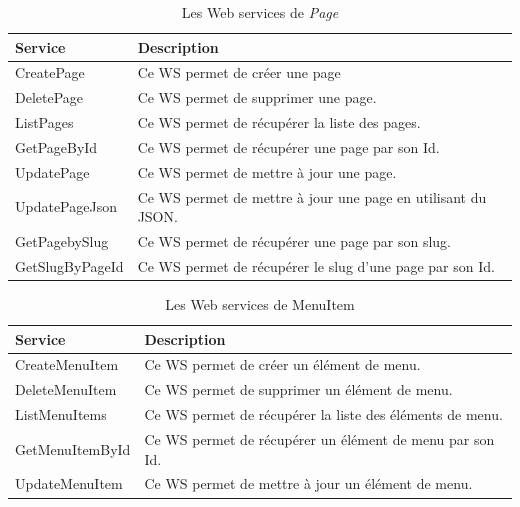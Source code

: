 \begin{table}[H]
    \centering
    \begin{tabular}{|m{5cm}|m{10cm}|}
        \hline
        \textbf{Service} & \textbf{Description}                                         \\
        \hline
        CreatePage       & Ce WS permet de créer une page                               \\
        \hline
        DeletePage       & Ce WS permet de supprimer une page.                          \\
        \hline
        ListPages        & Ce WS permet de récupérer la liste des pages.                \\
        \hline
        GetPageById      & Ce WS permet de récupérer une page par son Id.               \\
        \hline
        UpdatePage       & Ce WS permet de mettre à jour une page.                      \\
        \hline
        UpdatePageJson   & Ce WS permet de mettre à jour une page en utilisant du JSON. \\
        \hline
        GetPagebySlug    & Ce WS permet de récupérer une page par son slug.             \\
        \hline
        GetSlugByPageId  & Ce WS permet de récupérer le slug d'une page par son Id.     \\
        \hline
    \end{tabular}
    \caption{Les Web services de \textit{Page}}
    \label{tab:my_label}
\end{table}





\begin{table}[H]
    \centering
    \begin{tabular}{|m{5cm}|m{10cm}|}
        \hline
        \textbf{Service} & \textbf{Description}                                     \\
        \hline
        CreateMenuItem   & Ce WS permet de créer un élément de menu.                \\
        \hline
        DeleteMenuItem   & Ce WS permet de supprimer un élément de menu.            \\
        \hline
        ListMenuItems    & Ce WS permet de récupérer la liste des éléments de menu. \\
        \hline
        GetMenuItemById  & Ce WS permet de récupérer un élément de menu par son Id. \\
        \hline
        UpdateMenuItem   & Ce WS permet de mettre à jour un élément de menu.        \\
        \hline
    \end{tabular}
    \caption{Les Web services de MenuItem}
    \label{tab:my_label}
\end{table}







